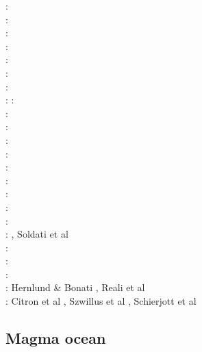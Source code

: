 \begin{scriptsize}
\nineteeneightysix: \cite{dagu86}\\
\nineteeneightyeight: \cite{hayu88}\\
\nineteeneightynine: \cite{hayu89}\\
\nineteenninetysix: \cite{boeh96}\\
\nineteenninetyseven: \cite{kell97}\\
\nineteenninetyeight: \cite{tack98b}\\
\twothousandone: \cite{soga01}\\
\twothousandtwo: \cite{somo02}\cite{tagh02}
\twothousandfour: \cite{mczh04}\cite{nata04}\\
\twothousandfive: \cite{mczh05a}\cite{nata05}\cite{nata05b}\\
\twothousandsix: \cite{nata06}\\
\twothousandseven: \cite{heta07}\cite{moyu07}\cite{pelt07}\cite{hibl07}\cite{yumc07}\\
\twothousandeight: \cite{gamc08}\cite{nata08}\cite{stho08}\\
\twothousandten: \cite{stto10}\cite{mcgr10}\cite{nata10}\cite{vady10}\\
\twothousandeleven: \cite{bowg11}\cite{talz11}\cite{vayj11}\\
\twothousandtwelve: \cite{stto12}\cite{dagd12}\cite{dect12}\\
\twothousandthirteen: \cite{limc13}\cite{bogs13a}\cite{bogs13b}\\
\twothousandfourteen: \cite{budt14}\cite{lidt14}\cite{tovd14}\\
\twothousandfifteen: \cite{musd15}\cite{hafg15}\cite{delt15}\cite{wilm15}\cite{lidt15}, Soldati et al \cite{sobd15}\\
\twothousandsixteen: \cite{dost16}\cite{tosa16}\\
\twothousandseventeen: \cite{hish17}\cite{lizh17}\\
\twothousandeighteen: \cite{daga18}\cite{lizo18}\cite{hect18}\cite{dert18}\\
\twothousandnineteen: Hernlund \& Bonati \cite{hebo19}, Reali et al \cite{rejv19}\\
\twothousandtwenty: Citron et al \cite{cilw20}, Szwillus et al \cite{szes20}, Schierjott et al \cite{scrt20}
\end{scriptsize}

\subsection{Magma ocean}


